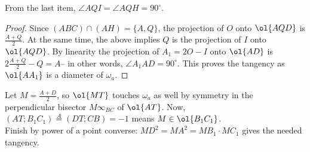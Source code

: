 \documentclass{seto}
\begin{document}
From the last item, $\angle AQI=\angle AQH=90^\circ$.
\begin{proof}Since $(ABC)\cap(AH)=\{A,Q\}$, the projection of $O$ onto $\ol{AQD}$ is $\frac{A+Q}2$. 
At the same time, the above implies $Q$ is the projection of $I$ onto $\ol{AQD}$. 
By linearity the projection of $A_1=2O-I$ onto $\ol{AD}$ is $2\frac{A+Q}2-Q=A$-- in other words, $\angle A_1AD=90^\circ$. 
This proves the tangency as $\ol{AA_1}$ is a diameter of $\omega_a$.\end{proof}
Let $M=\frac{A+D}2$, so $\ol{MT}$ touches $\omega_a$ as well by symmetry in the perpendicular bisector $M\infty_{BC}$ of $\ol{AT}$. 
Now, $(AT;B_1C_1)\overset A=(DT;CB)=-1$ means $M\in\ol{B_1C_1}$.\\[4pt]
Finish by power of a point converse: $MD^2=MA^2=MB_1\cdot MC_1$ gives the needed tangency.
\end{document}
